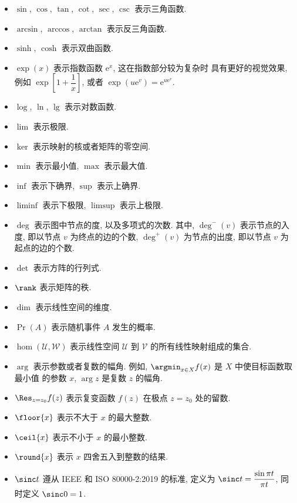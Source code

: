\begin{itemize}
    \item $\sin$, $\cos$, $\tan$, $\cot$, $\sec$, $\csc$ 表示三角函数.
    \item $\arcsin$, $\arccos$, $\arctan$ 表示反三角函数.
    \item $\sinh$, $\cosh$ 表示双曲函数.
    \item $\exp(x)$ 表示指数函数 $\mathrm{e}^{x}$, 这在指数部分较为复杂时
    具有更好的视觉效果, 例如 $\exp\left[ 1 + \dfrac{1}{x} \right]$,
    或者 $\exp(u \mathrm{e}^v) = \mathrm{e}^{u\mathrm{e}^v}$.
    \item $\log$, $\ln$, $\lg$ 表示对数函数.
    \item $\lim$ 表示极限.
    \item $\ker$ 表示映射的核或者矩阵的零空间.
    \item $\min$ 表示最小值, $\max$ 表示最大值.
    \item $\inf$ 表示下确界, $\sup$ 表示上确界.
    \item $\liminf$ 表示下极限, $\limsup$ 表示上极限.
    \item $\deg$ 表示图中节点的度, 以及多项式的次数.
    其中, $\deg^-(v)$ 表示节点的入度, 即以节点 $v$ 为终点的边的个数,
    $\deg^+(v)$ 为节点的出度, 即以节点 $v$ 为起点的边的个数.
    \item $\det$ 表示方阵的行列式.
    \item $\rank$ 表示矩阵的秩.
    \item $\dim$ 表示线性空间的维度.
    \item $\Pr(A)$ 表示随机事件 $A$ 发生的概率.
    \item $\hom(\mathcal{U}, \mathcal{W})$ 表示线性空间 $\mathcal{U}$ 到
    $\mathcal{V}$ 的所有线性映射组成的集合.
    \item $\arg$ 表示参数或者复数的幅角. 例如, $\argmin_{x \in X} f(x)$ 是 $X$ 中使目标函数取最小值
    的参数 $x$, $\arg z$ 是复数 $z$ 的幅角.
    \item $\Res_{z = z_0} f(z)$ 表示复变函数 $f(z)$ 
    在极点 $z = z_0$ 处的留数.
    \item $\floor{x}$ 表示不大于 $x$ 的最大整数.
    \item $\ceil{x}$ 表示不小于 $x$ 的最小整数.
    \item $\round{x}$ 表示 $x$ 四舍五入到整数的结果.
    \item $\sinc t$ 遵从 IEEE 和 ISO 80000-2:2019 的标准, 定义为 $\sinc t = \dfrac{\sin \pi t}{\pi t}$, 同时定义 $\sinc 0 = 1$.
\end{itemize}

